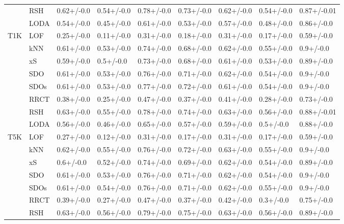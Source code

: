 \begin{table}
\begin{tabular}{lllllllll}
      & RSH &  0.62+/-0.0 &  0.54+/-0.0 &  0.78+/-0.0 &  0.73+/-0.0 &  0.62+/-0.0 &   0.54+/-0.0 &  0.87+/-0.01 \\
      & LODA &  0.54+/-0.0 &  0.45+/-0.0 &  0.61+/-0.0 &  0.53+/-0.0 &  0.57+/-0.0 &   0.48+/-0.0 &   0.86+/-0.0 \\
T1K & LOF &  0.25+/-0.0 &  0.11+/-0.0 &  0.31+/-0.0 &  0.18+/-0.0 &  0.31+/-0.0 &   0.17+/-0.0 &   0.59+/-0.0 \\
      & kNN &  0.61+/-0.0 &  0.53+/-0.0 &  0.74+/-0.0 &  0.68+/-0.0 &  0.62+/-0.0 &   0.55+/-0.0 &    0.9+/-0.0 \\
      & xS &  0.59+/-0.0 &   0.5+/-0.0 &  0.73+/-0.0 &  0.68+/-0.0 &  0.61+/-0.0 &   0.53+/-0.0 &   0.89+/-0.0 \\
      & SDO &  0.61+/-0.0 &  0.53+/-0.0 &  0.76+/-0.0 &  0.71+/-0.0 &  0.62+/-0.0 &   0.54+/-0.0 &    0.9+/-0.0 \\
      & SDOs &  0.61+/-0.0 &  0.53+/-0.0 &  0.77+/-0.0 &  0.72+/-0.0 &  0.61+/-0.0 &   0.54+/-0.0 &    0.9+/-0.0 \\
      & RRCT &  0.38+/-0.0 &  0.25+/-0.0 &  0.47+/-0.0 &  0.37+/-0.0 &  0.41+/-0.0 &   0.28+/-0.0 &   0.73+/-0.0 \\
      & RSH &  0.63+/-0.0 &  0.55+/-0.0 &  0.78+/-0.0 &  0.74+/-0.0 &  0.63+/-0.0 &   0.56+/-0.0 &  0.88+/-0.01 \\
      & LODA &  0.56+/-0.0 &  0.46+/-0.0 &  0.65+/-0.0 &  0.57+/-0.0 &  0.59+/-0.0 &    0.5+/-0.0 &   0.88+/-0.0 \\
T5K & LOF &  0.27+/-0.0 &  0.12+/-0.0 &  0.31+/-0.0 &  0.17+/-0.0 &  0.31+/-0.0 &   0.17+/-0.0 &   0.59+/-0.0 \\
      & kNN &  0.62+/-0.0 &  0.55+/-0.0 &  0.76+/-0.0 &  0.72+/-0.0 &  0.63+/-0.0 &   0.55+/-0.0 &    0.9+/-0.0 \\
      & xS &   0.6+/-0.0 &  0.52+/-0.0 &  0.74+/-0.0 &  0.69+/-0.0 &  0.62+/-0.0 &   0.54+/-0.0 &   0.89+/-0.0 \\
      & SDO &  0.61+/-0.0 &  0.53+/-0.0 &  0.76+/-0.0 &  0.71+/-0.0 &  0.62+/-0.0 &   0.54+/-0.0 &    0.9+/-0.0 \\
      & SDOs &  0.61+/-0.0 &  0.54+/-0.0 &  0.76+/-0.0 &  0.71+/-0.0 &  0.62+/-0.0 &   0.55+/-0.0 &    0.9+/-0.0 \\
      & RRCT &  0.39+/-0.0 &  0.27+/-0.0 &  0.47+/-0.0 &  0.37+/-0.0 &  0.42+/-0.0 &    0.3+/-0.0 &   0.75+/-0.0 \\
      & RSH &  0.63+/-0.0 &  0.56+/-0.0 &  0.79+/-0.0 &  0.75+/-0.0 &  0.63+/-0.0 &   0.56+/-0.0 &   0.89+/-0.0 \\

\end{tabular}
\end{table}
